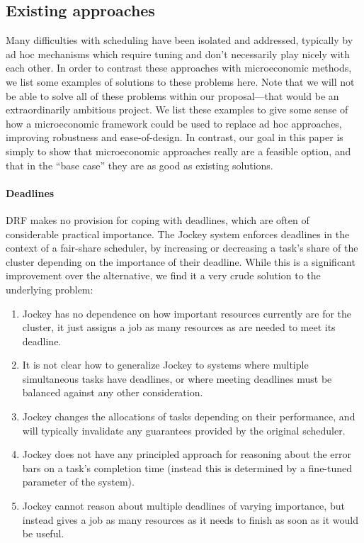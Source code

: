 \documentclass{acm_proc_article-sp}
\begin{document}
\subsection{Existing approaches}
Many difficulties with scheduling have been isolated and addressed, typically by
ad hoc mechanisms which require tuning and don't necessarily play nicely with
each other. In order to contrast these approaches with microeconomic methods, we
list some examples of solutions to these problems here. Note that we will not be
able to solve all of these problems within our proposal---that would be an
extraordinarily ambitious project. We list these examples to give some sense of
how a microeconomic framework could be used to replace ad hoc approaches,
improving robustness and ease-of-design. In contrast, our goal in this paper is
simply to show that microeconomic approaches really are a feasible option, and
that in the ``base case'' they are as good as existing solutions.

\paragraph{Deadlines} DRF makes no provision for coping with deadlines, which
are often of considerable practical importance. The Jockey system enforces
deadlines in the context of a fair-share scheduler, by increasing or decreasing
a task's share of the cluster depending on the importance of their deadline.
While this is a significant improvement over the alternative, we find it a very
crude solution to the underlying problem:
\begin{enumerate}
  \item Jockey has no dependence on how important resources currently are for
    the cluster, it just assigns a job as many resources as are needed to meet
    its deadline.
  \item It is not clear how to generalize Jockey to systems where multiple
    simultaneous tasks have deadlines, or where meeting deadlines must be
    balanced against any other consideration.
  \item Jockey changes the allocations of tasks depending on their performance,
    and will typically invalidate any guarantees provided by the original
    scheduler.
  \item Jockey does not have any principled approach for reasoning about the
    error bars on a task's completion time (instead this is determined by a
    fine-tuned parameter of the system).
  \item Jockey cannot reason about multiple deadlines of varying importance, but
    instead gives a job as many resources as it needs to finish as soon as it
    would be useful.
\end{enumerate}
\end{document}
